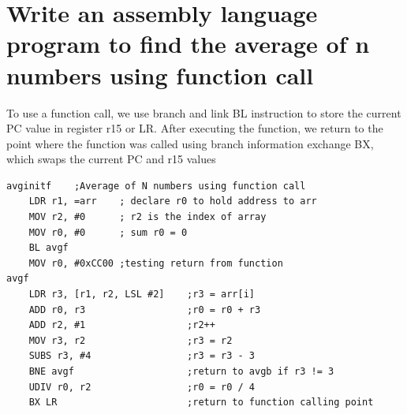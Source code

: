 \documentclass{article}
\begin{document}
\section{Write an assembly language program to find the average of n numbers using function call}
    To use a function call, we use branch and link BL instruction to store the current PC value in register r15 or LR. After executing the function, we return to the point where the function was called using branch information exchange BX, which swaps the current PC and r15 values
    \begin{verbatim}
avginitf	;Average of N numbers using function call
    LDR r1, =arr	; declare r0 to hold address to arr
    MOV r2, #0		; r2 is the index of array
    MOV r0, #0		; sum r0 = 0
    BL avgf
    MOV r0, #0xCC00	;testing return from function
avgf
    LDR r3, [r1, r2, LSL #2]	;r3 = arr[i]
    ADD r0, r3					;r0 = r0 + r3
    ADD r2, #1					;r2++
    MOV r3, r2					;r3 = r2
    SUBS r3, #4					;r3 = r3 - 3
    BNE avgf					;return to avgb if r3 != 3
    UDIV r0, r2					;r0 = r0 / 4
    BX LR						;return to function calling point
    \end{verbatim}
\end{document}
